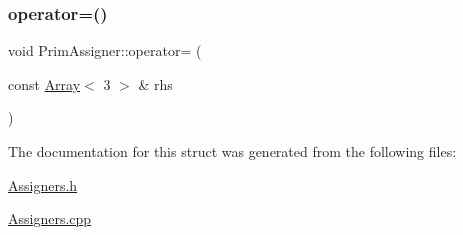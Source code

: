 \subsubsection{\texorpdfstring{operator=()}{operator=()}}
{\footnotesize\ttfamily void Prim\+Assigner\+::operator= (\begin{DoxyParamCaption}\item[{const \hyperlink{Includes_8h_abd9de33944f934950000c3929e14ad8d}{Array}$<$ 3 $>$ \&}]{rhs }\end{DoxyParamCaption})}



The documentation for this struct was generated from the following files\+:\begin{DoxyCompactItemize}
\item 
\hyperlink{Assigners_8h}{Assigners.\+h}\item 
\hyperlink{Assigners_8cpp}{Assigners.\+cpp}\end{DoxyCompactItemize}
